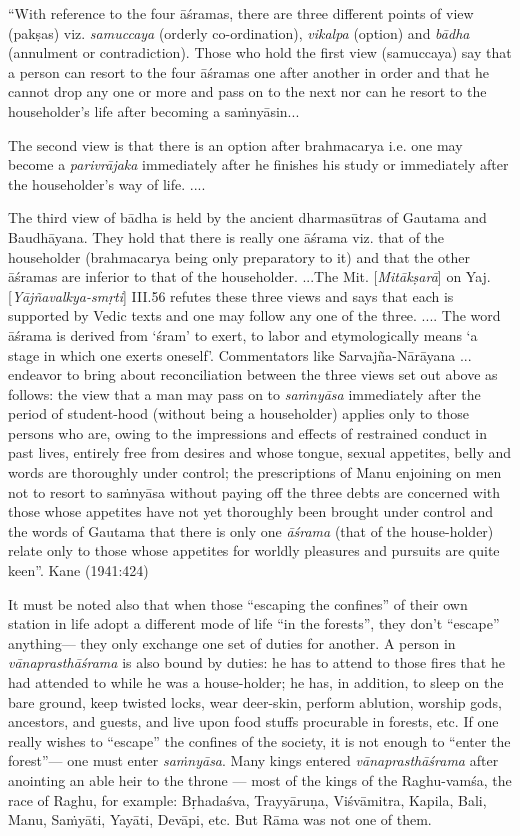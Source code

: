 \begin{myquote}
“With reference to the four āśramas, there are three different points of view (pakṣas) viz. {\sl samuccaya} (orderly co-ordination), {\sl vikalpa} (option) and {\sl bādha} (annulment or contradiction). Those who hold the first view (samuccaya) say that a person can resort to the four āśramas one after another in order and that he cannot drop any one or more and pass on to the next nor can he resort to the householder's life after becoming a saṁnyāsin... 

The second view is that there is an option after brahmacarya i.e. one may become a {\sl parivrājaka} immediately after he finishes his study or immediately after the householder's way of life. ....
 
The third view of bādha is held by the ancient dharmasūtras of Gautama and Baudhāyana. They hold that there is really one āśrama viz. that of the householder (brahmacarya being only preparatory to it) and that the other āśramas are inferior to that of the householder. ...The Mit. [{\sl Mitākṣarā}] on Yaj. [{\sl Yājñavalkya-smṛti}] III.56 refutes these three views and says that each is supported by Vedic texts and one may follow any one of the three. .... The word āśrama is derived from `śram' to exert, to labor and etymologically means `a stage in which one exerts oneself'.  Commentators like Sarvajña-Nārāyana ... endeavor to bring about reconciliation between the three views set out above as follows: the view that a man may pass on to {\sl saṁnyāsa} immediately after the period of student-hood (without being a householder) applies only to those persons who are, owing to the impressions and effects of restrained conduct in past lives, entirely free from desires and whose tongue, sexual appetites, belly and words are thoroughly under control; the prescriptions of Manu enjoining on men not to resort to saṁnyāsa without paying off the three debts are concerned with those whose appetites have not yet thoroughly been brought under control and the words of Gautama that there is only one {\sl āśrama} (that of the house-holder) relate only to those whose appetites for worldly pleasures and pursuits are quite keen”.
\hfill Kane (1941:424)
\end{myquote}

It must be noted also that when those “escaping the confines” of their own station in life adopt a different mode of life “in the forests”, they don’t “escape” anything--- they only exchange one set of duties for another. A person in {\sl vānaprasthāśrama} is also bound by duties: he has to attend to those fires that he had attended to while he was a house-holder; he has, in addition, to sleep on the bare ground, keep twisted locks, wear deer-skin, perform ablution, worship gods, ancestors, and guests, and live upon food stuffs procurable in forests, etc. If one really wishes to “escape” the confines of the society, it is not enough to “enter the forest”--- one must enter {\sl saṁnyāsa}. Many kings entered {\sl vānaprasthāśrama} after anointing an able heir to the throne --- most of the kings of the Raghu-vamśa, the race of Raghu, for example: Bṛhadaśva, Trayyāruṇa, Viśvāmitra, Kapila, Bali, Manu, Saṁyāti, Yayāti, Devāpi, etc. But Rāma was not one of them. 

